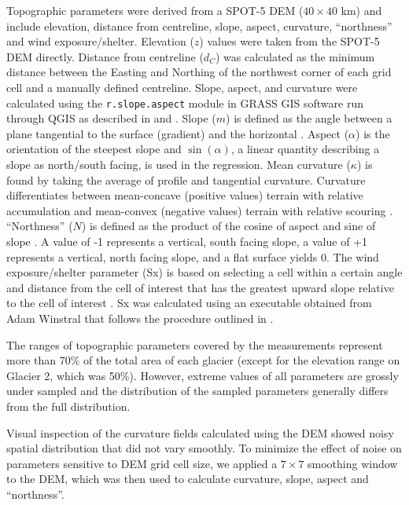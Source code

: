 \documentclass[twocolumn,letterpaper]{igs}
\begin{document}
Topographic parameters were derived from a SPOT-5 DEM ($40\times40$ km) \citep{Korona2009} and include elevation, distance from centreline, slope, aspect, curvature, ``northness'' and wind exposure/shelter. Elevation ($z$) values were taken from the SPOT-5 DEM directly. Distance from centreline ($d_C$) was calculated as the minimum distance between the Easting and Northing of the northwest corner of each grid cell and a manually defined centreline. Slope, aspect, and curvature were calculated using the \texttt{r.slope.aspect} module in GRASS GIS software run through QGIS as described in \cite{Mitavsova1993} and \cite{Hofierka2009}. Slope ($m$) is defined as the angle between a plane tangential to the surface (gradient) and the horizontal \citep{Olaya2009}. Aspect ($\alpha$) is the orientation of the steepest slope and $\sin(\alpha)$, a linear quantity describing a slope as north/south facing, is used in the regression. Mean curvature ($\kappa$) is found by taking the average of profile and tangential curvature. Curvature differentiates between mean-concave (positive values) terrain with relative accumulation and mean-convex (negative values) terrain with relative scouring \citep{Olaya2009}.   ``Northness'' ($N$) is defined as the product of the cosine of aspect and sine of slope \citep{Molotch2005}. A value of -1 represents a vertical, south facing slope, a value of +1 represents a vertical, north facing slope, and a flat surface yields 0. The wind exposure/shelter parameter (Sx) is based on selecting a cell within a certain angle and distance from the cell of interest that has the greatest upward slope relative to the cell of interest \citep{Winstral2002}. Sx was calculated using an executable obtained from Adam Winstral that follows the procedure outlined in \cite{Winstral2002}. 

The ranges of topographic parameters covered by the measurements represent more than 70\% of the total area of each glacier (except for the elevation range on Glacier 2, which was 50\%). However, extreme values of all parameters are grossly under sampled and the
distribution of the sampled parameters generally differs from the full distribution.

Visual inspection of the curvature fields calculated using the DEM showed noisy spatial
distribution that did not vary smoothly. To minimize the effect of noise on parameters sensitive to DEM grid cell size, we applied a $7\times7$ smoothing window to the DEM, which was then used to calculate curvature, slope, aspect and ``northness''.
\end{document}
